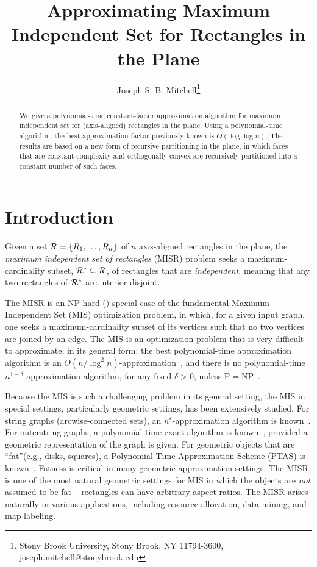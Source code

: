 \documentclass{article}
\title{Approximating Maximum Independent Set for Rectangles in the Plane}
\author{Joseph S. B. Mitchell\thanks{Stony Brook University, 
Stony Brook, NY 11794-3600, joseph.mitchell@stonybrook.edu}}
\newcommand{\eps}{\varepsilon}
\begin{document}
\maketitle

\begin{abstract}
We give a polynomial-time constant-factor approximation algorithm for
maximum independent set for (axis-aligned) rectangles in the plane.
Using a polynomial-time algorithm, the best approximation factor
previously known is $O(\log\log n)$.  The results are based on a new
form of recursive partitioning in the plane, in which faces that are
constant-complexity and orthogonally convex are recursively
partitioned into a constant number of such faces.
\end{abstract}

\section{Introduction}

Given a set ${\cal R}=\{R_1,\ldots,R_n\}$ of $n$ axis-aligned
rectangles in the plane, the {\em maximum independent set of
  rectangles} (MISR) problem seeks a maximum-cardinality subset,
${\cal R}^*\subseteq {\cal R}$, of rectangles that are {\em
  independent}, meaning that any two rectangles of ${\cal R}^*$ are
interior-disjoint.
%

The MISR is an NP-hard (\cite{fowler1981optimal,imai1983finding})
special case of the fundamental Maximum Independent Set (MIS)
optimization problem, in which, for a given input graph, one seeks a
maximum-cardinality subset of its vertices such that no two vertices
are joined by an edge.
%
The MIS is an optimization problem that is very difficult to
approximate, in its general form; the best polynomial-time
approximation algorithm is an $O(n/\log^2
n)$-approximation~\cite{boppana1992approximating}, and there is no
polynomial-time $n^{1-\delta}$-approximation algorithm, for any fixed
$\delta>0$, unless P$=$NP~\cite{zuckerman2007linear}.


Because the MIS is such a challenging problem in its general setting,
the MIS in special settings, particularly geometric settings, has
been extensively studied. For string graphs (arcwise-connected sets), an
$n^\eps$-approximation algorithm is known~\cite{fox2011computing}.
%
%
For outerstring graphs, a polynomial-time exact algorithm is
known~\cite{outerstring}, provided a geometric representation of the
graph is given.
%
For geometric objects that are ``fat''(e.g., disks, squares), a
Polynomial-Time Approximation Scheme (PTAS) is
known~\cite{erlebach2005polynomial}.  Fatness is critical in many
geometric approximation settings.  The MISR is one of the most natural
geometric settings for MIS in which the objects are {\em not} assumed
to be fat -- rectangles can have arbitrary aspect ratios.
%
The MISR arises naturally in various applications, including
resource allocation, %
data mining, %
and map labeling. %
\end{document}
